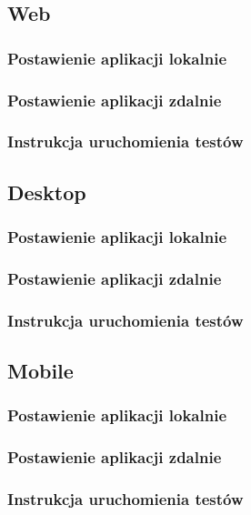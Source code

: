 \documentclass{article}
\begin{document}
    \subsection{Web}
        \subsubsection{Postawienie aplikacji lokalnie}
        \subsubsection{Postawienie aplikacji zdalnie}
        \subsubsection{Instrukcja uruchomienia testów}
    \subsection{Desktop}
        \subsubsection{Postawienie aplikacji lokalnie}
        \subsubsection{Postawienie aplikacji zdalnie}
        \subsubsection{Instrukcja uruchomienia testów}
    \subsection{Mobile}
        \subsubsection{Postawienie aplikacji lokalnie}
        \subsubsection{Postawienie aplikacji zdalnie}
        \subsubsection{Instrukcja uruchomienia testów}
\end{document}

